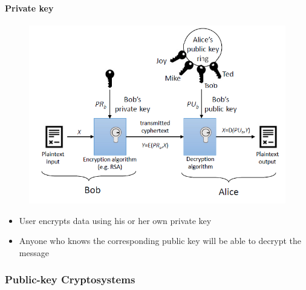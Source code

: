 \documentclass{article}
\begin{document}
                                \paragraph{Private key}
                                    \begin{figure}
                                        \begin{center}
                                            \includegraphics{../immagini/private_key.png}
                                        \end{center}
                                    \end{figure}
                                    \begin{itemize}
                                        \item User encrypts data using his or her own private key
                                        \item Anyone who knows the corresponding public key will be able to decrypt the message
                                    \end{itemize}
                            \subsubsection{Public-key Cryptosystems}
\end{document}
